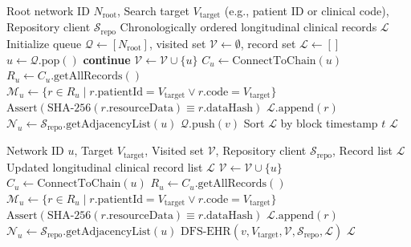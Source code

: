\documentclass[conference]{IEEEtran}
\theoremstyle{definition}
\begin{document}
\begin{algorithm}[H]
\caption{Level-Order Breadth-First Search ($\text{BFS-EHR}$)}
\label{alg:bfs}
\begin{algorithmic}[1]
\Require Root network ID $N_{\text{root}}$, Search target $V_{\text{target}}$ (e.g., patient ID or clinical code), Repository client $\mathcal{S}_{\text{repo}}$
\Ensure Chronologically ordered longitudinal clinical records $\mathcal{L}$
\State Initialize queue $\mathcal{Q} \leftarrow [N_{\text{root}}]$, visited set $\mathcal{V} \leftarrow \emptyset$, record set $\mathcal{L} \leftarrow []$
    \State $u \leftarrow \mathcal{Q}.\text{pop}()$
        \State \textbf{continue}
    \EndIf
    \State $\mathcal{V} \leftarrow \mathcal{V} \cup \{u\}$
    \State $C_u \leftarrow \text{ConnectToChain}(u)$
    \State $R_u \leftarrow C_u.\text{getAllRecords}()$
    \State $\mathcal{M}_u \leftarrow \{r \in R_u \mid r.\text{patientId} = V_{\text{target}} \lor r.\text{code} = V_{\text{target}}\}$
        \State $\text{Assert}(\text{SHA-256}(r.\text{resourceData}) \equiv r.\text{dataHash})$
        \State $\mathcal{L}.\text{append}(r)$
    \EndFor
    \State $\mathcal{N}_u \leftarrow \mathcal{S}_{\text{repo}}.\text{getAdjacencyList}(u)$
        \State $\mathcal{Q}.\text{push}(v)$
    \EndFor
\EndWhile
\State Sort $\mathcal{L}$ by block timestamp $t$
\State \Return $\mathcal{L}$
\end{algorithmic}
\end{algorithm}

\begin{algorithm}[H]
\caption{Depth-First Longitudinal Search ($\text{DFS-EHR}$)}
\label{alg:dfs}
\begin{algorithmic}[1]
\Require Network ID $u$, Target $V_{\text{target}}$, Visited set $\mathcal{V}$, Repository client $\mathcal{S}_{\text{repo}}$, Record list $\mathcal{L}$
\Ensure Updated longitudinal clinical record list $\mathcal{L}$
\State $\mathcal{V} \leftarrow \mathcal{V} \cup \{u\}$
\State $C_u \leftarrow \text{ConnectToChain}(u)$
\State $R_u \leftarrow C_u.\text{getAllRecords}()$
\State $\mathcal{M}_u \leftarrow \{r \in R_u \mid r.\text{patientId} = V_{\text{target}} \lor r.\text{code} = V_{\text{target}}\}$
    \State $\text{Assert}(\text{SHA-256}(r.\text{resourceData}) \equiv r.\text{dataHash})$
    \State $\mathcal{L}.\text{append}(r)$
\EndFor
\State $\mathcal{N}_u \leftarrow \mathcal{S}_{\text{repo}}.\text{getAdjacencyList}(u)$
        \State $\text{DFS-EHR}(v, V_{\text{target}}, \mathcal{V}, \mathcal{S}_{\text{repo}}, \mathcal{L})$
    \EndIf
\EndFor
\State \Return $\mathcal{L}$
\end{algorithmic}
\end{algorithm}
\end{document}
